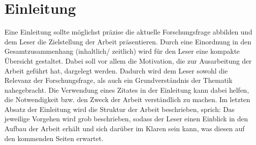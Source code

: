 
\chapter{Einleitung}
\label{chap:Einleitung}

Eine Einleitung sollte möglichst präzise die aktuelle Forschungsfrage abbilden und dem
Leser die Zielstellung der Arbeit präsentieren. Durch eine Einordnung in den Gesamtzusammenhang
(inhaltlich/ zeitlich) wird für den Leser eine kompakte Übersicht gestaltet.
Dabei soll vor allem die Motivation, die zur Ausarbeitung der Arbeit geführt hat, dargelegt
werden. Dadurch wird dem Leser sowohl die Relevanz der Forschungsfrage, als auch
ein Grundverständnis der Thematik nahegebracht. Die Verwendung eines Zitates in der
Einleitung kann dabei helfen, die Notwendigkeit bzw. den Zweck der Arbeit verständlich
zu machen.
Im letzten Absatz der Einleitung wird die Struktur der Arbeit beschrieben, sprich: Das jeweilige Vorgehen wird grob beschrieben, sodass der Leser einen Einblick in den Aufbau der Arbeit erhält und sich darüber im Klaren sein kann, was diesen auf den kommenden Seiten erwartet.



